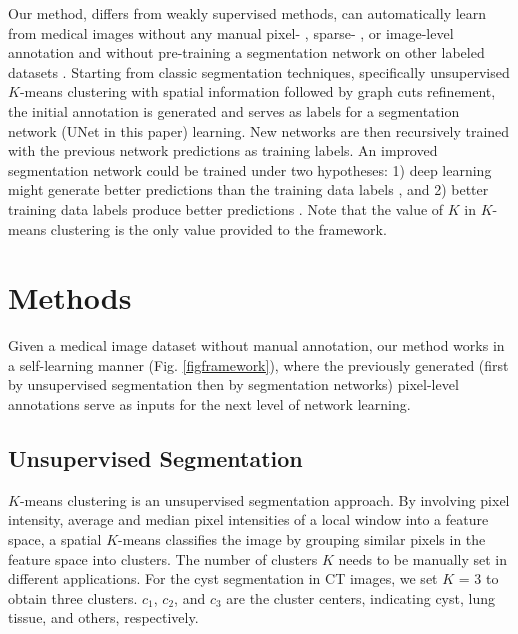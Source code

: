 \documentclass{article}
\begin{document}
Our method, differs from weakly supervised methods, can automatically learn from medical images without any manual pixel- \cite{yang2017suggestive}, sparse- \cite{khoreva2017simple}, or image-level \cite{jia2017constrained} annotation and without pre-training a segmentation network on other labeled datasets \cite{khoreva2017simple}. Starting from classic segmentation techniques, specifically unsupervised $K$-means clustering with spatial information followed by graph cuts \cite{boykov2004experimental} refinement, the initial annotation is generated and serves as labels for a segmentation network (UNet \cite{ronneberger2015u} in this paper) learning. New networks are then recursively trained with the previous network predictions as training labels. An improved segmentation network could be trained under two hypotheses: 1) deep learning might generate better predictions than the training data labels \cite{guan2017said}, and 2) better training data labels produce better predictions \cite{silver2017mastering}. Note that the value of $K$ in $K$-means clustering is the only value provided to the framework. 



\section{Methods}

Given a medical image dataset without manual annotation, our method works in a self-learning manner (Fig. \ref{figframework}), where the previously generated (first by unsupervised segmentation then by segmentation networks) pixel-level annotations serve as inputs for the next level of network learning. %

\subsection{Unsupervised Segmentation}
$K$-means clustering is an unsupervised segmentation approach. By involving pixel intensity, average and median pixel intensities of a local window into a feature space, a spatial $K$-means \cite{li2012cytoplasm} classifies the image by grouping similar pixels in the feature space into clusters. The number of clusters $K$ needs to be manually set in different applications. For the cyst segmentation in CT images, we set $K$ = 3 to obtain three clusters. $c_{1}$, $c_{2}$, and $c_{3}$ are the cluster centers, indicating cyst, lung tissue, and others, respectively.
\end{document}
